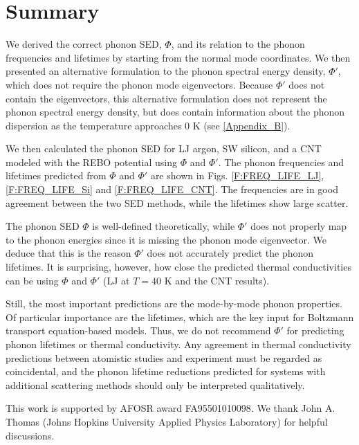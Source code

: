 \documentclass[12pt,twocolumn,iop]{/usr/share/texmf-texlive/tex/latex/iop/iopart}[/usr/share/texmf-texlive/tex/latex/iop/]
\begin{document}
\vspace*{0mm}

\section{\label{Section_Conclusions}Summary}

We derived the correct phonon SED, $\Phi$, and its relation to the phonon frequencies and lifetimes by starting from the normal mode coordinates. We then presented an alternative formulation to the phonon spectral energy density, $\Phi'$, which does not require the phonon mode eigenvectors.  Because $\Phi'$ does not contain the eigenvectors, this alternative formulation does not represent the phonon spectral energy density, but does contain information about the phonon dispersion as the temperature approaches $0$ K (see \ref{Appendix_B}).

We then calculated the phonon SED for LJ argon, SW silicon, and a CNT modeled with the REBO potential using $\Phi$ and $\Phi'$. The phonon frequencies and
lifetimes predicted from $\Phi$ and $\Phi'$ are shown in Figs$.$ \ref{F:FREQ_LIFE_LJ}, \ref{F:FREQ_LIFE_Si} and \ref{F:FREQ_LIFE_CNT}. The
frequencies are in good agreement between the two SED methods, while the lifetimes show large scatter.

The phonon SED $\Phi$ is well-defined theoretically, while $\Phi'$ does not properly map to the phonon energies since it is missing the phonon mode eigenvector. We deduce that this is the reason $\Phi'$ does not accurately predict the phonon lifetimes. It is surprising, however, how close the predicted thermal conductivities can be using $\Phi$ and $\Phi'$ (LJ at $T=40$ K and the CNT results).

Still, the most important predictions are the mode-by-mode phonon properties. Of particular importance are the lifetimes, which are the key input for Boltzmann transport equation-based models.\cite{mcgaughey2011a} Thus, we do not recommend $\Phi'$ for predicting phonon lifetimes or thermal conductivity.  Any agreement in thermal conductivity predictions between atomistic studies\cite{thomas2010c} and experiment\cite{dekoker2009,qiu2011} must be regarded as coincidental, and the phonon lifetime reductions predicted for systems with additional scattering methods \cite{thomas2010c,shiomi2011a} should only be interpreted qualitatively.

\ack
This work is supported by AFOSR award FA95501010098. We thank John A. Thomas (Johns Hopkins University Applied Physics Laboratory) for helpful discussions.
\end{document}
